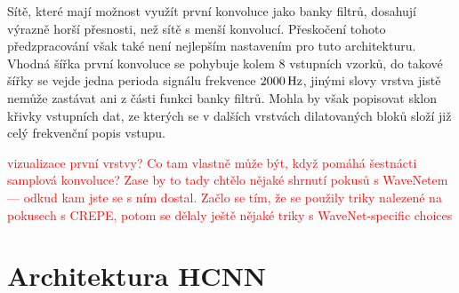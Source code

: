 Sítě, které mají možnost využít první konvoluce jako banky filtrů, dosahují výrazně horší přesnosti, než sítě s menší konvolucí. Přeskočení tohoto předzpracování však také není nejlepším nastavením pro tuto architekturu. Vhodná šířka první konvoluce se pohybuje kolem 8 vstupních vzorků, do takové šířky se vejde jedna perioda signálu frekvence $2000\,\rm Hz$, jinými slovy vrstva jistě nemůže zastávat ani z části funkci banky filtrů. Mohla by však popisovat sklon křivky vstupních dat, ze kterých se v dalších vrstvách dilatovaných bloků složí již celý frekvenční popis vstupu.

\textcolor{red}{vizualizace první vrstvy? Co tam vlastně může být, když pomáhá šestnácti samplová konvoluce?}
\textcolor{red}{Zase by to tady chtělo nějaké shrnutí pokusů s WaveNetem — odkud kam jste se s ním dostal. Začlo se tím, že se použily triky nalezené na pokusech s CREPE, potom se dělaly ještě nějaké triky s WaveNet-specific choices}




\section{Architektura HCNN}

